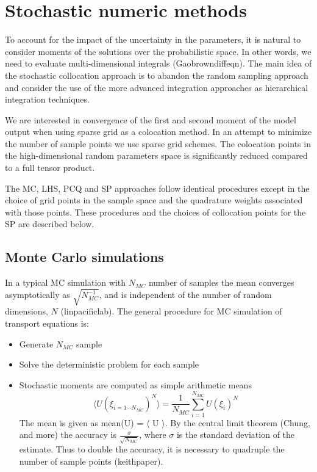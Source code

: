 \documentclass{article}
\begin{document}
\section{Stochastic numeric methods}
To account for the impact of the uncertainty in the parameters, it is natural to consider moments
of the solutions over the probabilistic space. In other words, we need to evaluate multi-dimensional
integrals (Gaobrowndiffeqn). The main idea of the stochastic collocation approach is to abandon the 
random sampling approach and consider the use of the more advanced integration approaches as 
hierarchical integration techniques.

We are interested in convergence of the first and second moment of the model output when using sparse
grid as a colocation method. In an attempt to minimize the number of sample points we use sparse grid
schemes. The colocation points in the high-dimensional random parameters space is significantly reduced 
compared to a full tensor product. 

The MC, LHS, PCQ and SP approaches follow identical procedures except in the 
choice of grid points in the sample space and the quadrature weights associated with those 
points. These procedures and the choices of collocation points for the SP are described below.

\subsection{Monte Carlo simulations}
In a typical MC simulation with $N_{MC}$ number of samples the mean converges asymptotically as 
$\sqrt{N_{MC}^{-1}}$, and is independent of the number of random dimensions, $N$ (linpacificlab).
The general procedure for MC simulation of transport equations is:
\begin{itemize}
\item Generate $N_{MC}$ sample
\item Solve the deterministic problem for each sample
\item Stochastic moments are computed as simple arithmetic means
\begin{equation}
\langle U(\xi_{i=1\cdots N_{MC}})^N\rangle = \frac{1}{N_{MC}}\sum_{i=1}^{N_{MC}}U(\xi_i)^N
\end{equation}
The mean is given as mean(U) = $\langle$ U $\rangle$. By the central limit theorem (Chung, and more)
the accuracy is $\frac{\sigma}{\sqrt{N_{MC}}}$, where $\sigma$ is the standard deviation of the estimate. 
Thus to double the accuracy, it is necessary to quadruple the number of sample points (keithpaper). 
\end{itemize}
\end{document}
